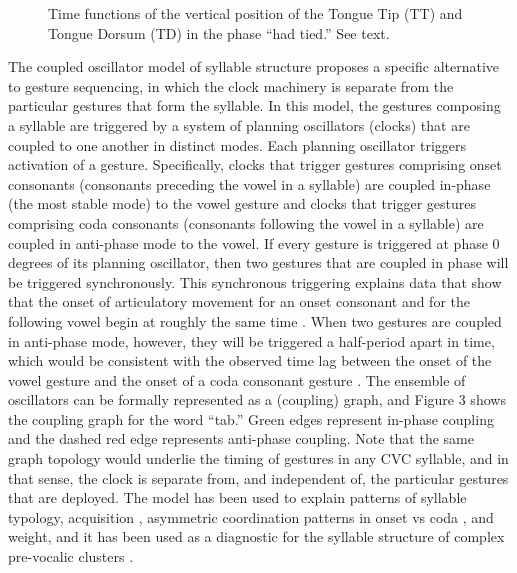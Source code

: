 \documentclass[output=paper,
modfonts
]{LSP/langsci}
\begin{document}
\begin{figure}[htpb]
\caption{Time functions of the vertical position of the Tongue Tip (TT) and Tongue Dorsum (TD) in the phase ``had tied.'' See text.}\label{fig:had-tied}
\end{figure}

The coupled oscillator model of syllable structure \citep{Goldstein2006} proposes a specific alternative to gesture sequencing, in which the clock machinery is separate from the particular gestures that form the syllable. In this model, the gestures composing a syllable are triggered by a system of planning oscillators (clocks) that are coupled to one another in distinct modes. Each planning oscillator triggers activation of a gesture. Specifically, clocks that trigger gestures comprising onset consonants (consonants preceding the vowel in a syllable) are coupled in-phase (the most stable mode) to the vowel gesture and clocks that trigger gestures comprising coda consonants (consonants following the vowel in a syllable) are coupled in anti-phase mode to the vowel. If every gesture is triggered at phase 0 degrees of its planning oscillator, then two gestures that are coupled in phase will be triggered synchronously. This synchronous triggering explains data that show that the onset of articulatory movement for an onset consonant and for the following vowel begin at roughly the same time \citep{Goldstein2006}.  When two gestures are coupled in anti-phase mode, however, they will be triggered a half-period apart in time, which would be consistent with the observed time lag between the onset of the vowel gesture and the onset of a coda consonant gesture \citep{Goldstein2006}.   The ensemble of oscillators can be formally represented as a (coupling) graph, and Figure 3 shows the coupling graph for the word ``tab.'' Green edges represent in-phase coupling and the dashed red edge represents anti-phase coupling. Note that the same graph topology would underlie the timing of gestures in any CVC syllable, and in that sense, the clock is separate from, and independent of, the particular gestures that are deployed. The model has been used to explain patterns of syllable typology, acquisition \citep{Nam2009}, asymmetric coordination patterns in onset vs coda \citep{Marin2010}, and weight, and it has been used as a diagnostic for the syllable structure of complex pre-vocalic clusters \citep{Hermes2013, Shaw2009}. 
\end{document}

